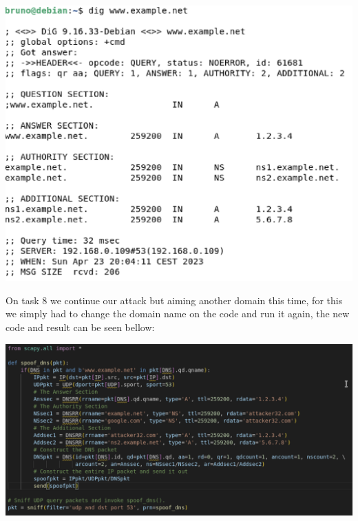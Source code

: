 \documentclass{article}
\begin{document}
\begin{center}
  \includegraphics[scale=0.5]{images/Task7.png}
\end{center}

On task 8 we continue our attack but aiming another domain this time, for this we simply had to change the domain name on the code and run it again, the new code and result can be seen bellow:

\begin{center}
  \includegraphics[scale=0.5]{images/Task8-code.png}
\end{center}
\end{document}

